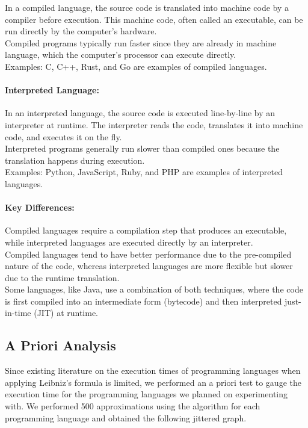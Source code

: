 \documentclass[12pt,halfline,a4paper,]{ouparticle}
\begin{document}
\hfill\break
In a compiled language, the source code is translated into machine code
by a compiler before execution. This machine code, often called an
executable, can be run directly by the computer's hardware.\\
Compiled programs typically run faster since they are already in machine
language, which the computer's processor can execute directly.\\
Examples: C, C++, Rust, and Go are examples of compiled languages.

\paragraph{Interpreted Language:}\label{interpreted-language}

\hfill\break
In an interpreted language, the source code is executed line-by-line by
an interpreter at runtime. The interpreter reads the code, translates it
into machine code, and executes it on the fly.\\
Interpreted programs generally run slower than compiled ones because the
translation happens during execution.\\
Examples: Python, JavaScript, Ruby, and PHP are examples of interpreted
languages.

\paragraph{Key Differences:}\label{key-differences}

Compiled languages require a compilation step that produces an
executable, while interpreted languages are executed directly by an
interpreter.\\
Compiled languages tend to have better performance due to the
pre-compiled nature of the code, whereas interpreted languages are more
flexible but slower due to the runtime translation.\\
Some languages, like Java, use a combination of both techniques, where
the code is first compiled into an intermediate form (bytecode) and then
interpreted just-in-time (JIT) at runtime.\\

\subsection{A Priori Analysis}\label{a-priori-analysis}

Since existing literature on the execution times of programming
languages when applying Leibniz's formula is limited, we performed an a
priori test to gauge the execution time for the programming languages we
planned on experimenting with. We performed 500 approximations using the
algorithm for each programming language and obtained the following
jittered graph.\\
\strut \\
\end{document}
